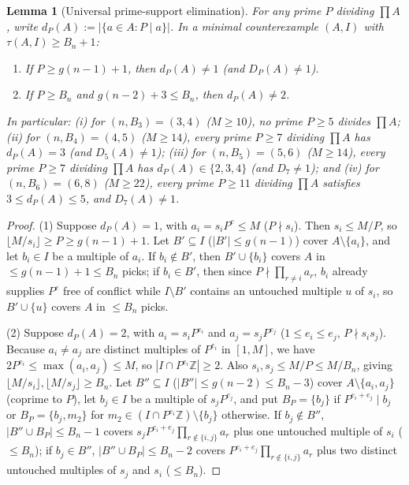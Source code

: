 \documentclass[11pt]{article}
\newtheorem{lemma}[theorem]{Lemma}
\begin{document}
\begin{lemma}[Universal prime-support elimination]
\label{lem:support}
For any prime $P$ dividing $\prod A$, write $d_P(A) := |\{a \in A : P \mid a\}|$. In a minimal counterexample $(A, I)$ with $\tau(A, I) \ge B_n + 1$:
\begin{enumerate}
\item If $P \ge g(n - 1) + 1$, then $d_P(A) \neq 1$ (and $D_P(A) \neq 1$).
\item If $P \ge B_n$ and $g(n - 2) + 3 \le B_n$, then $d_P(A) \neq 2$.
\end{enumerate}
In particular: (i) for $(n, B_3) = (3, 4)$ ($M \ge 10$), no prime $P \ge 5$ divides $\prod A$; (ii) for $(n, B_4) = (4, 5)$ ($M \ge 14$), every prime $P \ge 7$ dividing $\prod A$ has $d_P(A) = 3$ (and $D_5(A) \neq 1$); (iii) for $(n, B_5) = (5, 6)$ ($M \ge 14$), every prime $P \ge 7$ dividing $\prod A$ has $d_P(A) \in \{2, 3, 4\}$ (and $D_7 \neq 1$); and (iv) for $(n, B_6) = (6, 8)$ ($M \ge 22$), every prime $P \ge 11$ dividing $\prod A$ satisfies $3 \le d_P(A) \le 5$, and $D_7(A) \neq 1$.
\end{lemma}
\begin{proof}
(1) Suppose $d_P(A) = 1$, with $a_i = s_i P^e \le M$ ($P \nmid s_i$). Then $s_i \le M / P$, so $\lfloor M / s_i \rfloor \ge P \ge g(n - 1) + 1$. Let $B' \subseteq I$ ($|B'| \le g(n - 1)$) cover $A \setminus \{a_i\}$, and let $b_i \in I$ be a multiple of $a_i$. If $b_i \notin B'$, then $B' \cup \{b_i\}$ covers $A$ in $\le g(n - 1) + 1 \le B_n$ picks; if $b_i \in B'$, then since $P \nmid \prod_{r \neq i} a_r$, $b_i$ already supplies $P^e$ free of conflict while $I \setminus B'$ contains an untouched multiple $u$ of $s_i$, so $B' \cup \{u\}$ covers $A$ in $\le B_n$ picks.

(2) Suppose $d_P(A) = 2$, with $a_i = s_i P^{e_i}$ and $a_j = s_j P^{e_j}$ ($1 \le e_i \le e_j$, $P \nmid s_i s_j$). Because $a_i \neq a_j$ are distinct multiples of $P^{e_i}$ in $[1, M]$, we have $2 P^{e_i} \le \max(a_i, a_j) \le M$, so $|I \cap P^{e_i} \mathbb{Z}| \ge 2$. Also $s_i, s_j \le M / P \le M / B_n$, giving $\lfloor M / s_i \rfloor, \lfloor M / s_j \rfloor \ge B_n$. Let $B'' \subseteq I$ ($|B''| \le g(n - 2) \le B_n - 3$) cover $A \setminus \{a_i, a_j\}$ (coprime to $P$), let $b_j \in I$ be a multiple of $s_j P^{e_j}$, and put $B_P = \{b_j\}$ if $P^{e_i + e_j} \mid b_j$ or $B_P = \{b_j, m_2\}$ for $m_2 \in (I \cap P^{e_i} \mathbb{Z}) \setminus \{b_j\}$ otherwise. If $b_j \notin B''$, $|B'' \cup B_P| \le B_n - 1$ covers $s_j P^{e_i + e_j} \prod_{r \notin \{i, j\}} a_r$ plus one untouched multiple of $s_i$ ($\le B_n$); if $b_j \in B''$, $|B'' \cup B_P| \le B_n - 2$ covers $P^{e_i + e_j} \prod_{r \notin \{i, j\}} a_r$ plus two distinct untouched multiples of $s_j$ and $s_i$ ($\le B_n$).
\end{proof}
\end{document}
